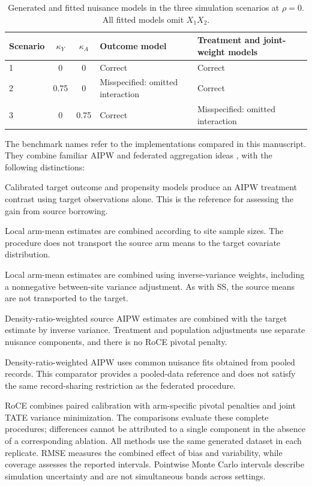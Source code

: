 \documentclass[12pt]{article}
\begin{document}
\begin{table}[H]
\centering
\begingroup
{}
\caption{Generated and fitted nuisance models in the three simulation scenarios at $\rho=0$. All fitted models omit $X_1X_2$.}
\label{tab:simulation_models}
\begin{tabular}{lccp{3.5cm}p{4.0cm}}
\toprule
Scenario & $\kappa_Y$ & $\kappa_A$ & Outcome model & Treatment and joint-weight models\\
\midrule
1 & 0 & 0 & Correct & Correct\\
2 & 0.75 & 0 & Misspecified: omitted interaction & Correct\\
3 & 0 & 0.75 & Correct & Misspecified: omitted interaction\\
\bottomrule
\end{tabular}
\endgroup
\end{table}

The benchmark names refer to the implementations compared in this manuscript. They combine familiar AIPW and federated aggregation ideas \citep{bang2005doubly,xiong2023federated}, with the following distinctions:
\begin{description}[leftmargin=1em,labelindent=0pt,style=nextline,itemsep=.25\baselineskip]
\item[Calibrated target-only.] Calibrated target outcome and propensity models produce an AIPW treatment contrast using target observations alone. This is the reference for assessing the gain from source borrowing.
\item[Sample-size aggregation (SS).] Local arm-mean estimates are combined according to site sample sizes. The procedure does not transport the source arm means to the target covariate distribution.
\item[Inverse-variance aggregation (IVW).] Local arm-mean estimates are combined using inverse-variance weights, including a nonnegative between-site variance adjustment. As with SS, the source means are not transported to the target.
\item[Federated-DR.] Density-ratio-weighted source AIPW estimates are combined with the target estimate by inverse variance. Treatment and population adjustments use separate nuisance components, and there is no RoCE pivotal penalty.
\item[Pooled-DR.] Density-ratio-weighted AIPW uses common nuisance fits obtained from pooled records. This comparator provides a pooled-data reference and does not satisfy the same record-sharing restriction as the federated procedure.
\end{description}
RoCE combines paired calibration with arm-specific pivotal penalties and joint TATE variance minimization. The comparisons evaluate these complete procedures; differences cannot be attributed to a single component in the absence of a corresponding ablation. All methods use the same generated dataset in each replicate. RMSE measures the combined effect of bias and variability, while coverage assesses the reported intervals. Pointwise Monte Carlo intervals describe simulation uncertainty and are not simultaneous bands across settings.
\FloatBarrier
\end{document}
